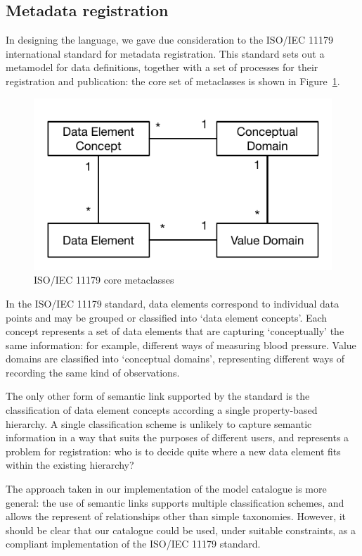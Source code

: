 \subsection{Metadata registration}

In designing the language, we gave due consideration to the ISO/IEC
11179 international standard for metadata registration.  This standard
sets out a metamodel for data definitions, together with a set of
processes for their registration and publication: the core set of
metaclasses is shown in Figure~\ref{fig:11179}. 

\begin{figure}[h]
  \centering
  \includegraphics[width=0.75\columnwidth]{ASEFigs/11179metamodel}
  \caption{ISO/IEC 11179 core metaclasses} 
  \label{fig:11179}
\end{figure}

In the ISO/IEC 11179 standard, data elements correspond to individual
data points and may be grouped or classified into `data element
concepts'.  Each concept represents a set of data elements that are
capturing `conceptually' the same information: for example, different
ways of measuring blood pressure.  Value domains are classified into
`conceptual domains', representing different ways of recording the
same kind of observations. 

The only other form of semantic link supported by the standard is the
classification of data element concepts according a single
property-based hierarchy.  A single classification scheme is unlikely
to capture semantic information in a way that suits the purposes of
different users, and represents a problem for registration: who is to
decide quite where a new data element fits within the existing
hierarchy?  

The approach taken in our implementation of the model catalogue is
more general: the use of semantic links supports multiple
classification schemes, and allows the represent of relationships
other than simple taxonomies.  However, it should be clear that our
catalogue could be used, under suitable constraints, as a compliant
implementation of the ISO/IEC 11179 standard. 


